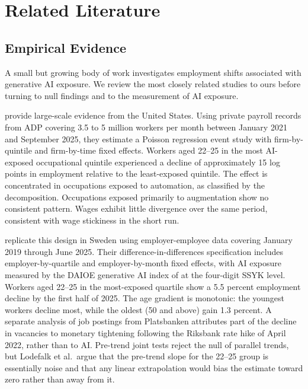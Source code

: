 \documentclass[12pt]{article}
\begin{document}
\section{Related Literature}\label{sec:literature}

\subsection{Empirical Evidence}

A small but growing body of work investigates employment shifts associated with generative AI exposure. We review the most closely related studies to ours before turning to null findings and to the measurement of AI exposure.

\cite{brynjolfsson2025} provide large-scale evidence from the United States. Using private payroll records from ADP covering 3.5 to 5 million workers per month between January 2021 and September 2025, they estimate a Poisson regression event study with firm-by-quintile and firm-by-time fixed effects. Workers aged 22--25 in the most AI-exposed occupational quintile experienced a decline of approximately 15 log points in employment relative to the least-exposed quintile. The effect is concentrated in occupations exposed to automation, as classified by the \cite{handa2025} decomposition. Occupations exposed primarily to augmentation show no consistent pattern. Wages exhibit little divergence over the same period, consistent with wage stickiness in the short run.

\cite{lodefalk2026} replicate this design in Sweden using employer-employee data covering January 2019 through June 2025. Their difference-in-differences specification includes employer-by-quartile and employer-by-month fixed effects, with AI exposure measured by the DAIOE generative AI index of \cite{engberg2024} at the four-digit SSYK level. Workers aged 22--25 in the most-exposed quartile show a 5.5 percent employment decline by the first half of 2025. The age gradient is monotonic: the youngest workers decline most, while the oldest (50 and above) gain 1.3 percent. A separate analysis of job postings from Platsbanken attributes part of the decline in vacancies to monetary tightening following the Riksbank rate hike of April 2022, rather than to AI. Pre-trend joint tests reject the null of parallel trends, but Lodefalk et al.\ argue that the pre-trend slope for the 22--25 group is essentially noise and that any linear extrapolation would bias the estimate toward zero rather than away from it.
\end{document}
